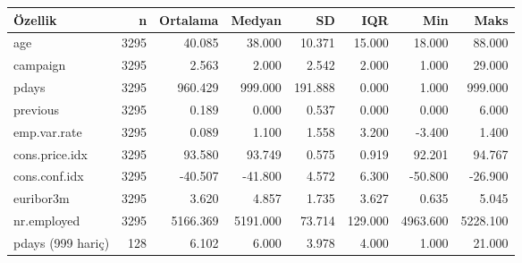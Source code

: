 \begin{tabular}{lrrrrrrr}\toprule
Özellik & n & Ortalama & Medyan & SD & IQR & Min & Maks \\\midrule
age & 3295 & 40.085 & 38.000 & 10.371 & 15.000 & 18.000 & 88.000 \\
campaign & 3295 & 2.563 & 2.000 & 2.542 & 2.000 & 1.000 & 29.000 \\
pdays & 3295 & 960.429 & 999.000 & 191.888 & 0.000 & 1.000 & 999.000 \\
previous & 3295 & 0.189 & 0.000 & 0.537 & 0.000 & 0.000 & 6.000 \\
emp.var.rate & 3295 & 0.089 & 1.100 & 1.558 & 3.200 & -3.400 & 1.400 \\
cons.price.idx & 3295 & 93.580 & 93.749 & 0.575 & 0.919 & 92.201 & 94.767 \\
cons.conf.idx & 3295 & -40.507 & -41.800 & 4.572 & 6.300 & -50.800 & -26.900 \\
euribor3m & 3295 & 3.620 & 4.857 & 1.735 & 3.627 & 0.635 & 5.045 \\
nr.employed & 3295 & 5166.369 & 5191.000 & 73.714 & 129.000 & 4963.600 & 5228.100 \\
pdays (999 hariç) & 128 & 6.102 & 6.000 & 3.978 & 4.000 & 1.000 & 21.000 \\
\bottomrule\end{tabular}